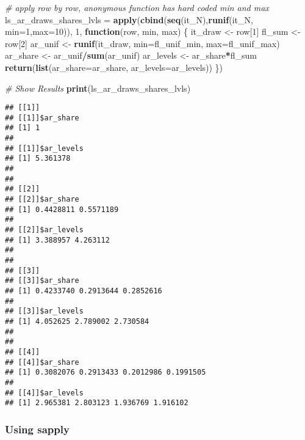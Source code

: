 \documentclass[
]{book}
\newenvironment{Shaded}{\begin{snugshade}}{\end{snugshade}}
\newcommand{\CommentTok}[1]{\textcolor[rgb]{0.56,0.35,0.01}{\textit{#1}}}
\newcommand{\ControlFlowTok}[1]{\textcolor[rgb]{0.13,0.29,0.53}{\textbf{#1}}}
\newcommand{\DataTypeTok}[1]{\textcolor[rgb]{0.13,0.29,0.53}{#1}}
\newcommand{\DecValTok}[1]{\textcolor[rgb]{0.00,0.00,0.81}{#1}}
\newcommand{\KeywordTok}[1]{\textcolor[rgb]{0.13,0.29,0.53}{\textbf{#1}}}
\newcommand{\NormalTok}[1]{#1}
\newcommand{\OperatorTok}[1]{\textcolor[rgb]{0.81,0.36,0.00}{\textbf{#1}}}
\newcommand{\StringTok}[1]{\textcolor[rgb]{0.31,0.60,0.02}{#1}}
\begin{document}
\begin{Shaded}
\begin{Highlighting}[]
\CommentTok{# apply row by row, anonymous function has hard coded min and max}
\NormalTok{ls_ar_draws_shares_lvls =}\StringTok{ }\KeywordTok{apply}\NormalTok{(}\KeywordTok{cbind}\NormalTok{(}\KeywordTok{seq}\NormalTok{(it_N),}\KeywordTok{runif}\NormalTok{(it_N, }\DataTypeTok{min=}\DecValTok{1}\NormalTok{,}\DataTypeTok{max=}\DecValTok{10}\NormalTok{)),}
                                \DecValTok{1}\NormalTok{,}
                                \ControlFlowTok{function}\NormalTok{(row, min, max) \{}
\NormalTok{                                 it_draw <-}\StringTok{ }\NormalTok{row[}\DecValTok{1}\NormalTok{]}
\NormalTok{                                 fl_sum <-}\StringTok{ }\NormalTok{row[}\DecValTok{2}\NormalTok{]}
\NormalTok{                                 ar_unif <-}\StringTok{ }\KeywordTok{runif}\NormalTok{(it_draw,}
                                                  \DataTypeTok{min=}\NormalTok{fl_unif_min,}
                                                  \DataTypeTok{max=}\NormalTok{fl_unif_max)}
\NormalTok{                                 ar_share <-}\StringTok{ }\NormalTok{ar_unif}\OperatorTok{/}\KeywordTok{sum}\NormalTok{(ar_unif)}
\NormalTok{                                 ar_levels <-}\StringTok{ }\NormalTok{ar_share}\OperatorTok{*}\NormalTok{fl_sum}
                                 \KeywordTok{return}\NormalTok{(}\KeywordTok{list}\NormalTok{(}\DataTypeTok{ar_share=}\NormalTok{ar_share,}
                                             \DataTypeTok{ar_levels=}\NormalTok{ar_levels))}
\NormalTok{                                \})}

\CommentTok{# Show Results}
\KeywordTok{print}\NormalTok{(ls_ar_draws_shares_lvls)}
\end{Highlighting}
\end{Shaded}

\begin{verbatim}
## [[1]]
## [[1]]$ar_share
## [1] 1
## 
## [[1]]$ar_levels
## [1] 5.361378
## 
## 
## [[2]]
## [[2]]$ar_share
## [1] 0.4428811 0.5571189
## 
## [[2]]$ar_levels
## [1] 3.388957 4.263112
## 
## 
## [[3]]
## [[3]]$ar_share
## [1] 0.4233740 0.2913644 0.2852616
## 
## [[3]]$ar_levels
## [1] 4.052625 2.789002 2.730584
## 
## 
## [[4]]
## [[4]]$ar_share
## [1] 0.3082076 0.2913433 0.2012986 0.1991505
## 
## [[4]]$ar_levels
## [1] 2.965381 2.803123 1.936769 1.916102
\end{verbatim}

\hypertarget{using-sapply}{%
\subsubsection{Using sapply}\label{using-sapply}}
\end{document}
